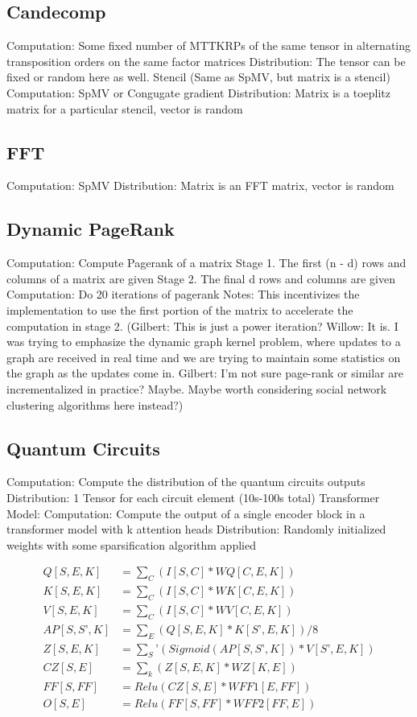 \documentclass{article}
\begin{document}
\subsection{Candecomp}
	Computation: Some fixed number of MTTKRPs of the same tensor in alternating transposition orders on the same factor matrices
	Distribution: The tensor can be fixed or random here as well.
Stencil (Same as SpMV, but matrix is a stencil)
	Computation: SpMV or Congugate gradient
	Distribution: Matrix is a toeplitz matrix for a particular stencil, vector is random

\subsection{FFT}
	Computation: SpMV
	Distribution: Matrix is an FFT matrix, vector is random

\subsection{Dynamic PageRank}
	Computation: Compute Pagerank of a matrix
	Stage 1.
		The first (n - d) rows and columns of a matrix are given
	Stage 2.
		The final d rows and columns are given
	Computation:
		Do 20 iterations of pagerank
	Notes: This incentivizes the implementation to use the first portion of the matrix to accelerate the computation in stage 2.
(Gilbert: This is just a power iteration? Willow: It is. I was trying to emphasize the dynamic graph kernel problem, where updates to a graph are received in real time and we are trying to maintain some statistics on the graph as the updates come in. Gilbert: I'm not sure page-rank or similar are incrementalized in practice?  Maybe.  Maybe worth considering social network clustering algorithms here instead?)

\subsection{Quantum Circuits}
	Computation: Compute the distribution of the quantum circuits outputs
	Distribution: 1 Tensor for each circuit element (10s-100s total)
Transformer Model:
	Computation: Compute the output of a single encoder block in a transformer model with k attention heads
	Distribution: Randomly initialized weights with some sparsification algorithm applied
 
 \begin{align*}
Q[S, E, K] &= \sum_C(I[S, C] * WQ[C, E, K])\\
K[S, E, K] &= \sum_C(I[S, C] * WK[C, E, K])\\
V[S, E, K] &= \sum_C(I[S, C] * WV[C, E, K])\\
AP[S, S’, K] &= \sum_E(Q[S, E, K] * K[S’, E, K]) / 8\\
Z[S, E, K] &= \sum_S’(Sigmoid(AP[S,S’,K]) * V[S’, E, K])\\
CZ[S, E] &= \sum_k(Z[S, E, K] * WZ[K,E])\\
FF[S,FF] &= Relu(CZ[S,E] * WFF1[E,FF])\\
O[S,E] &= Relu(FF[S,FF] * WFF2[FF,E])\\
\end{align*}
\end{document}
